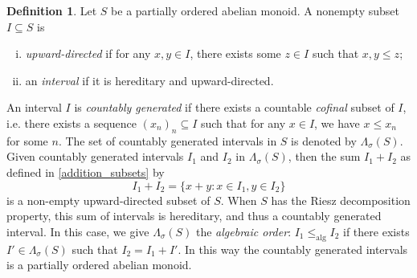 \documentclass[reqno]{amsart}
\theoremstyle{definition}
\newtheorem{defn}[thm]{Definition}
\theoremstyle{remark}
\numberwithin{equation}{section}
\theoremstyle{definition}
\begin{document}
\begin{defn} 
\label{defn_interval} 
Let $S$ be a partially ordered abelian monoid. A nonempty subset $I\subseteq S$ is
\begin{enumerate} [(i)] 
\item \textit{upward-directed} if for any $x, y\in I$, there exists some $z\in I$ such that $x, y\leq z$; 
\item an \textit{interval} if it is hereditary and upward-directed. 
\end{enumerate} 
An interval $I$ is \emph{countably generated} if there exists a countable \emph{cofinal} subset of $I$, i.e. there exists a sequence $(x_{n})_{n}\subseteq I$ such that for any $x\in I$, we have $x\leq x_{n}$ for some $n$. The set of countably generated intervals in $S$ is denoted by $\Lambda_{\sigma}(S)$. Given countably generated intervals $I_{1}$ and $I_{2}$ in $\Lambda_{\sigma}(S)$, then the sum $I_{1}+I_{2}$ as defined in \eqref{addition_subsets} by 
\begin{equation} 
I_{1}+I_{2} = \{x+y: x\in I_{1}, y\in I_{2}\} 
\end{equation} 
is a non-empty upward-directed subset of $S$.  When $S$ has the Riesz decomposition property, this sum of intervals is hereditary, and thus a countably generated interval. In this case, we give $\Lambda_{\sigma}(S)$ the \emph{algebraic order}:  $I_{1}\leq_{\text{alg}} I_{2}$ if there exists $I'\in \Lambda_{\sigma}(S)$ such that $I_{2} = I_{1}+I'$. In this way the countably generated intervals is a partially ordered abelian monoid. 
\end{defn}
\end{document}

